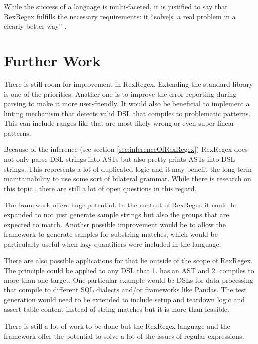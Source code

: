 While the success of a language is multi-faceted, it is justified to say that RexRegex fulfills the necessary requirements: it \enquote{solve[s] a real problem in a clearly better way} \cite{OnSuccessfulLanuageDesignKernighan}.

\section{Further Work}

There is still room for improvement in RexRegex. Extending the standard library is one of the priorities. Another one is to improve the error reporting during parsing to make it more user-friendly. It would also be beneficial to implement a linting mechanism that detects valid DSL that compiles to problematic patterns. This can include ranges like  that are most likely wrong or even super-linear patterns.

Because of the inference (see section \ref{sec:inferenceOfRexRegex}) RexRegex does not only parse DSL strings into ASTs but also pretty-prints ASTs into DSL strings. This represents a lot of duplicated logic and it may benefit the long-term maintainability to use some sort of bilateral grammar. While there is research on this topic \cite{BidirectionalGrammarsForMachineCode}\cite{GuidedGrammarConvergence}, there are still a lot of open questions in this regard.

The \utgast{} framework offers huge potential. In the context of RexRegex it could be expanded to not just generate sample strings but also the groups that are expected to match. Another possible improvement would be to allow the framework to generate samples for substring matches, which would be particularly useful when lazy quantifiers were included in the language.

There are also possible applications for \utgast{} that lie outside of the scope of RexRegex. The principle could be applied to any DSL that 1. has an AST and 2. compiles to more than one target. One particular example would be DSLs for data processing that compile to different SQL dialects and/or frameworks like Pandas. The test generation would need to be extended to include setup and teardown logic and assert table content instead of string matches but it is more than feasible. 

There is still a lot of work to be done but the RexRegex language and the \utgast{} framework offer the potential to solve a lot of the issues of regular expressions.
